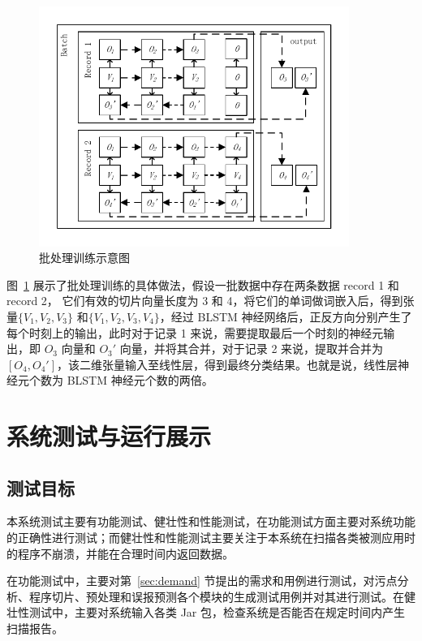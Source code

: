 \begin{figure}[!htb]
    \centering
    \includegraphics[width=0.9\textwidth]{FIGs/chapter4/blstmFoward.pdf}
    \caption{批处理训练示意图}\label{blstmForward}
\end{figure}

图~\ref{blstmForward} 展示了批处理训练的具体做法，假设一批数据中存在两条数据 record 1 和 record 2， 它们有效的切片向量长度为 3 和 4，将它们的单词做词嵌入后，得到张量$\{V_{1},V_{2},V_{3}\}$ 和$\{V_{1},V_{2},V_{3},V_{4}\}$，经过 BLSTM 神经网络后，正反方向分别产生了每个时刻上的输出，此时对于记录 1 来说，需要提取最后一个时刻的神经元输出，即 $O_3$ 向量和 $O_3'$ 向量，并将其合并，对于记录 2 来说，提取并合并为 $\left[O_{4}, O_{4}'\right]$，该二维张量输入至线性层，得到最终分类结果。也就是说，线性层神经元个数为 BLSTM 神经元个数的两倍。

\section{系统测试与运行展示}
\subsection{测试目标}
本系统测试主要有功能测试、健壮性和性能测试，在功能测试方面主要对系统功能的正确性进行测试；而健壮性和性能测试主要关注于本系统在扫描各类被测应用时的程序不崩溃，并能在合理时间内返回数据。

在功能测试中，主要对第~\ref{sec:demand} 节提出的需求和用例进行测试，对污点分析、程序切片、预处理和误报预测各个模块的生成测试用例并对其进行测试。在健壮性测试中，主要对系统输入各类 Jar 包，检查系统是否能否在规定时间内产生扫描报告。

